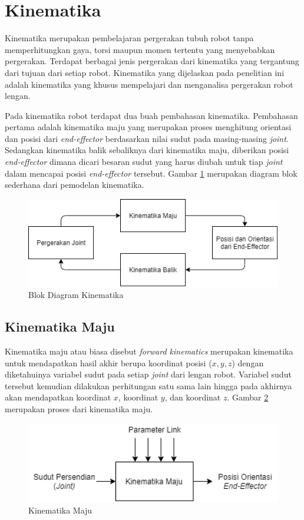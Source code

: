 \section{Kinematika}
Kinematika merupakan pembelajaran pergerakan tubuh robot tanpa memperhitungkan gaya, torsi maupun momen tertentu yang menyebabkan pergerakan. Terdapat berbagai jenis pergerakan dari kinematika yang tergantung dari tujuan dari setiap robot. Kinematika yang dijelaskan pada penelitian ini adalah kinematika yang khusus mempelajari dan menganalisa pergerakan robot lengan.  

Pada kinematika robot terdapat dua buah pembahasan kinematika. Pembahasan pertama adalah kinematika maju yang merupakan proses menghitung orientasi dan posisi dari\textit{ end-effector} berdasarkan nilai sudut pada masing-masing \textit{joint}.  Sedangkan kinematika balik sebaliknya dari kinematika maju, diberikan posisi \textit{end-effector} dimana dicari  besaran sudut yang harus diubah untuk tiap \textit{joint} dalam mencapai posisi \textit{end-effector} tersebut. Gambar \ref{pic.diagram.kinematika} merupakan diagram blok sederhana dari pemodelan kinematika.
	\begin{figure}[H]
	\centering
	\includegraphics[width=12cm]{gambar/kinematika_diagram.png}
	\caption{Blok Diagram Kinematika}
	\label{pic.diagram.kinematika}
\end{figure}

\subsection{Kinematika Maju}
Kinematika maju atau biasa disebut \textit{forward kinematics} merupakan kinematika untuk mendapatkan hasil akhir berupa koordinat posisi ($x, y, z$) dengan diketahuinya variabel sudut pada setiap \textit{joint} dari lengan robot.  Variabel sudut tersebut kemudian dilakukan perhitungan satu sama lain hingga pada akhirnya akan mendapatkan koordinat $x$, koordinat $y$, dan koordinat $z$. Gambar \ref{pic.kinematikamaju} merupakan proses dari kinematika maju.
	\begin{figure}[H]
	\centering
	\includegraphics[width=12cm]{gambar/Kinematika_maju.png}
	\caption{Kinematika Maju}
	\label{pic.kinematikamaju}
\end{figure}


